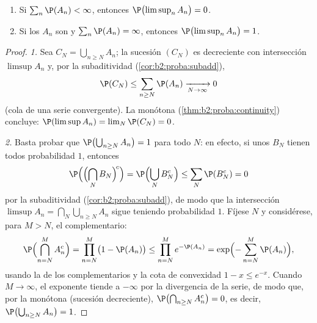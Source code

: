 \begin{theorem}\label{thm:b2:proba:borelcantelli}
\leavevmode
\begin{enumerate}
\item Si $\sum_{n} \P(A_n) < \infty$, entonces
$\P\bigl(\limsup_n A_n\bigr) = 0$.
\item Si los  $A_n$ son  y $\sum_n \P(A_n) =
\infty$, entonces $\P\bigl(\limsup_n A_n\bigr) = 1$.
\end{enumerate}
\end{theorem}

\begin{proof}
\emph{1.} Sea $C_N = \bigcup_{n \geq N}A_n$; la sucesión $(C_N)$ es
decreciente con intersección $\limsup A_n$ y, por la subaditividad
 (\cref{cor:b2:proba:subadd}),
\[
\P(C_N) \leq \sum_{n \geq N}\P(A_n)
\xrightarrow[N\to\infty]{} 0
\]
(cola de una serie convergente). La  monótona
(\cref{thm:b2:proba:continuity}) concluye: $\P(\limsup A_n) = \lim_N
\P(C_N) = 0$.

\emph{2.} Basta probar que $\P\bigl(\bigcup_{n\geq N}A_n\bigr) = 1$
para todo $N$: en efecto, si unos  $B_N$ tienen todos
probabilidad $1$, entonces
\[
\P\Bigl(\Bigl(\bigcap_NB_N\Bigr)^{\!c}\Bigr)
= \P\Bigl(\bigcup_NB_N^c\Bigr)
\leq \sum_N\P(B_N^c) = 0
\]
por la subaditividad  (\cref{cor:b2:proba:subadd}), de modo
que la intersección  $\limsup A_n =
\bigcap_N\bigcup_{n\geq N}A_n$ sigue teniendo probabilidad $1$.
Fíjese $N$ y considérese, para $M > N$, el complementario:
\[
\P\Bigl(\bigcap_{n=N}^{M} A_n^c\Bigr)
= \prod_{n=N}^{M}\bigl(1 - \P(A_n)\bigr)
\leq \prod_{n=N}^{M} e^{-\P(A_n)}
= \exp\Bigl(-\sum_{n=N}^M \P(A_n)\Bigr) ,
\]
usando la  de los complementarios y la cota de convexidad
$1 - x \leq e^{-x}$. Cuando $M \to \infty$, el exponente tiende a
$-\infty$ por la divergencia de la serie, de modo que, por la
 monótona (sucesión decreciente), $\P\bigl(\bigcap_{n \geq
N}A_n^c\bigr) = 0$, es decir, $\P\bigl(\bigcup_{n \geq N}A_n\bigr) =
1$.
\end{proof}

